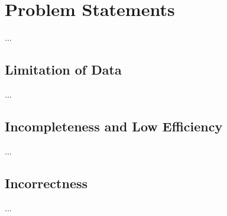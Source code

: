 \section{Problem Statements}

...


\subsection{Limitation of Data}


...

\subsection{Incompleteness and Low Efficiency}


...


\subsection{Incorrectness}


...




